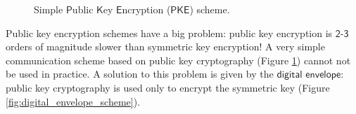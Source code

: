 \documentclass{article}
\begin{document}
\begin{figure}
    \centering
    \caption{Simple $\mathsf{P}$ublic $\mathsf{K}$ey $\mathsf{E}$ncryption ($\mathsf{PKE}$) scheme.}
    \label{fig:pke_scheme}
\end{figure}

\par \noindent Public key encryption schemes have a big problem: public key encryption is $\mathsf{2\text{-}3}$ orders of magnitude slower than symmetric key encryption! A very simple communication scheme based on public key cryptography (Figure \ref{fig:pke_scheme}) cannot not be used in practice. A solution to this problem is given by the $\mathsf{digital}$ $\mathsf{envelope}$: public key cryptography is used only to encrypt the symmetric key (Figure \ref{fig:digital_envelope_scheme}).
\end{document}
